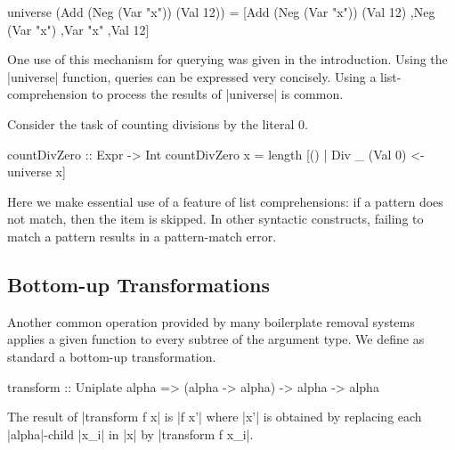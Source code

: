 \begin{code}
universe (Add (Neg (Var "x")) (Val 12)) =
    [Add (Neg (Var "x")) (Val 12)
    ,Neg (Var "x")
    ,Var "x"
    ,Val 12]
\end{code}

One use of this mechanism for querying was given in the introduction. Using the |universe| function, queries can be expressed very concisely. Using a list-comprehension to process the results of |universe| is common.

\begin{example}
\label{ex:zerocount}
Consider the task of counting divisions by the literal 0.

\begin{code}
countDivZero :: Expr -> Int
countDivZero x = length [() | Div _ (Val 0) <- universe x]
\end{code}

Here we make essential use of a feature of list comprehensions: if a pattern does not match, then the item is skipped. In other syntactic constructs, failing to match a pattern results in a pattern-match error.
\end{example}

\subsection{Bottom-up Transformations}

Another common operation provided by many boilerplate removal systems \citep{lammel:syb,stratego,strafunski,ren:generic_recursion_toolbox} applies a given function to every subtree of the argument type. We define as standard a bottom-up transformation.

\begin{code}
transform :: Uniplate alpha => (alpha -> alpha) -> alpha -> alpha
\end{code}

The result of |transform f x| is |f x'| where |x'| is obtained by replacing each |alpha|-child |x_i| in |x| by |transform f x_i|.

